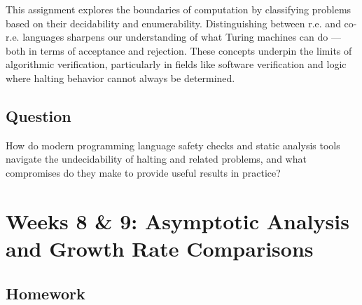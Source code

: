 \documentclass[11pt]{article}
\begin{document}
This assignment explores the boundaries of computation by classifying problems based on their decidability and enumerability. Distinguishing between r.e. and co-r.e. languages sharpens our understanding of what Turing machines can do — both in terms of acceptance and rejection. These concepts underpin the limits of algorithmic verification, particularly in fields like software verification and logic where halting behavior cannot always be determined.

\subsection{Question}

How do modern programming language safety checks and static analysis tools navigate the undecidability of halting and related problems, and what compromises do they make to provide useful results in practice?

\section{Weeks 8 \& 9: Asymptotic Analysis and Growth Rate Comparisons}

\subsection{Homework}
\end{document}
